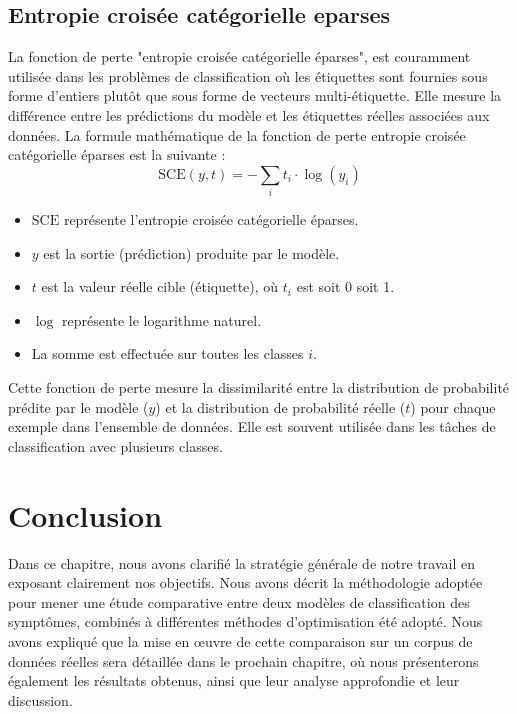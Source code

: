 \subsection{Entropie croisée catégorielle eparses}
La fonction de perte "entropie croisée catégorielle éparses", est couramment utilisée dans les problèmes de classification où les étiquettes sont fournies sous forme d'entiers plutôt que sous forme de vecteurs multi-étiquette. Elle mesure la différence entre les prédictions du modèle et les étiquettes réelles associées aux données. La formule mathématique de la fonction de perte entropie croisée catégorielle éparses est la suivante :
\[
\text{SCE}(y,t) = -\sum_i t_i \cdot \log(y_i)
\]
\begin{itemize}
    \item $\text{SCE}$ représente l'entropie croisée catégorielle éparses.
    \item $y$ est la sortie (prédiction) produite par le modèle.
    \item $t$ est la valeur réelle cible (étiquette), où $t_i$ est soit 0 soit 1.
    \item $\log$ représente le logarithme naturel.
    \item La somme est effectuée sur toutes les classes $i$.
\end{itemize}
Cette fonction de perte mesure la dissimilarité entre la distribution de probabilité prédite par le modèle ($y$) et la distribution de probabilité réelle ($t$) pour chaque exemple dans l'ensemble de données. Elle est souvent utilisée dans les tâches de classification avec plusieurs classes.
\newpage\section{Conclusion}
Dans ce chapitre, nous avons clarifié la stratégie générale de notre travail en exposant clairement nos objectifs. Nous avons décrit la méthodologie adoptée pour mener une étude comparative entre deux modèles de classification des symptômes, combinés à différentes méthodes d’optimisation été adopté. Nous avons expliqué que la mise en œuvre de cette comparaison sur un corpus de données réelles sera détaillée dans le prochain chapitre, où nous présenterons également les résultats obtenus, ainsi que leur analyse approfondie et leur discussion.
















